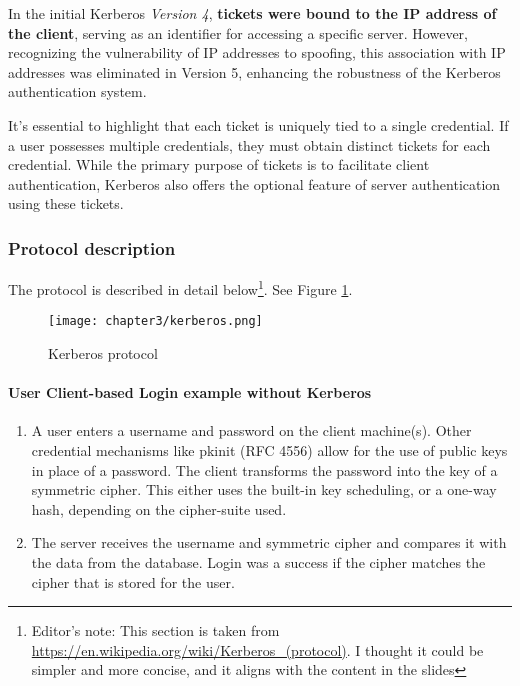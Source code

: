 In the initial Kerberos \textit{Version 4}, \textbf{tickets were bound to the IP address of the client}, serving as an identifier for accessing a specific server. However, recognizing the vulnerability of IP addresses to spoofing, this association with IP addresses was eliminated in Version 5, enhancing the robustness of the Kerberos authentication system.

It's essential to highlight that each ticket is uniquely tied to a single credential. If a user possesses multiple credentials, they must obtain distinct tickets for each credential. While the primary purpose of tickets is to facilitate client authentication, Kerberos also offers the optional feature of server authentication using these tickets.



\subsubsection{Protocol description}
The protocol is described in detail below\footnote{Editor's note: This section is taken from \url{https://en.wikipedia.org/wiki/Kerberos_(protocol)}. I thought it could be simpler and more concise, and it aligns with the content in the slides}.
See Figure \ref{fig:kerberos}.

\begin{figure}[H]
  \centering
  \texttt{[image: chapter3/kerberos.png]}
  \caption{Kerberos protocol}
  \label{fig:kerberos}
\end{figure}

\paragraph*{User Client-based Login example without Kerberos}

\begin{enumerate}
  \item A user enters a username and password on the client machine(s). Other credential mechanisms like pkinit (RFC 4556) allow for the use of public keys in place of a password. The client transforms the password into the key of a symmetric cipher. This either uses the built-in key scheduling, or a one-way hash, depending on the cipher-suite used.
  \item The server receives the username and symmetric cipher and compares it with the data from the database. Login was a success if the cipher matches the cipher that is stored for the user.
\end{enumerate}


